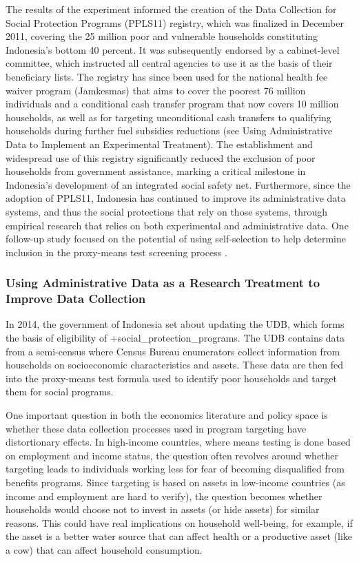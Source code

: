 \documentclass[
]{WileySix}
\begin{document}
The results of the experiment informed the creation of the Data Collection for Social Protection Programs (PPLS11) registry, which was finalized in December 2011, covering the 25 million poor and vulnerable households constituting Indonesia's bottom 40 percent. It was subsequently endorsed by a cabinet-level committee, which instructed all central agencies to use it as the basis of their beneficiary lists. The registry has since been used for the national health fee waiver program (Jamkesmas) that aims to cover the poorest 76 million individuals and a conditional cash transfer program that now covers 10 million households, as well as for targeting unconditional cash transfers to qualifying households during further fuel subsidies reductions (see Using Administrative Data to Implement an Experimental Treatment). The establishment and widespread use of this registry significantly reduced the exclusion of poor households from government assistance, marking a critical milestone in Indonesia's development of an integrated social safety net. Furthermore, since the adoption of PPLS11, Indonesia has continued to improve its administrative data systems, and thus the social protections that rely on those systems, through empirical research that relies on both experimental and administrative data. One follow-up study focused on the potential of using self-selection to help determine inclusion in the proxy-means test screening process \citep{alatas2016}.

\hypertarget{using-administrative-data-as-a-research-treatment-to-improve-data-collection}{%
\subsubsection{Using Administrative Data as a Research Treatment to Improve Data Collection}\label{using-administrative-data-as-a-research-treatment-to-improve-data-collection}}

In 2014, the government of Indonesia set about updating the UDB, which forms the basis of eligibility of +social\_protection\_programs\textbar. The UDB contains data from a semi-census where Census Bureau enumerators collect information from households on socioeconomic characteristics and assets. These data are then fed into the proxy-means test formula used to identify poor households and target them for social programs.

One important question in both the economics literature and policy space is whether these data collection processes used in program targeting have distortionary effects. In high-income countries, where means testing is done based on employment and income status, the question often revolves around whether targeting leads to individuals working less for fear of becoming disqualified from benefits programs. Since targeting is based on assets in low-income countries (as income and employment are hard to verify), the question becomes whether households would choose not to invest in assets (or hide assets) for similar reasons. This could have real implications on household well-being, for example, if the asset is a better water source that can affect health or a productive asset (like a cow) that can affect household consumption.
\end{document}
